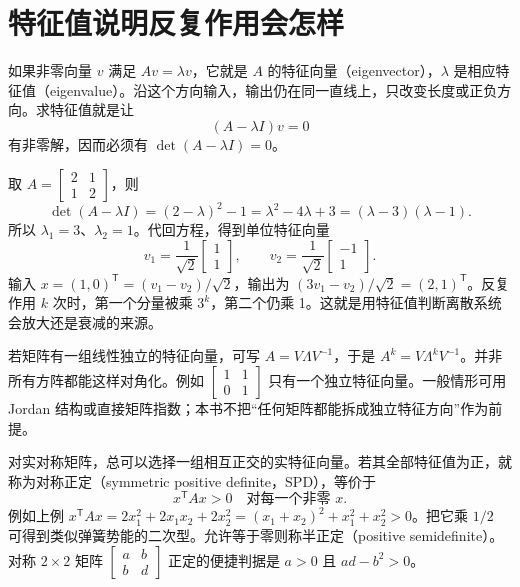 \section{特征值说明反复作用会怎样}
如果非零向量 $v$ 满足 $Av=\lambda v$，它就是 $A$ 的特征向量（eigenvector），$\lambda$ 是相应特征值（eigenvalue）。沿这个方向输入，输出仍在同一直线上，只改变长度或正负方向。求特征值就是让
\begin{equation}
 (A-\lambda I)v=0
\end{equation}
有非零解，因而必须有 $\det(A-\lambda I)=0$。
\begin{examplebox}[算例 手算两个特征值和两个特征方向]
取 $A=\begin{bmatrix}2&1\\1&2\end{bmatrix}$，则
\[
 \det(A-\lambda I)=(2-\lambda)^2-1
 =\lambda^2-4\lambda+3=(\lambda-3)(\lambda-1).
\]
所以 $\lambda_1=3$、$\lambda_2=1$。代回方程，得到单位特征向量
\[
 v_1=\frac{1}{\sqrt2}\begin{bmatrix}1\\1\end{bmatrix},\qquad
 v_2=\frac{1}{\sqrt2}\begin{bmatrix}-1\\1\end{bmatrix}.
\]
输入 $x=(1,0)^\mathsf T=(v_1-v_2)/\sqrt2$，输出为 $(3v_1-v_2)/\sqrt2=(2,1)^\mathsf T$。反复作用 $k$ 次时，第一个分量被乘 $3^k$，第二个仍乘 1。这就是用特征值判断离散系统会放大还是衰减的来源。
\end{examplebox}

若矩阵有一组线性独立的特征向量，可写 $A=V\Lambda V^{-1}$，于是 $A^k=V\Lambda^kV^{-1}$。并非所有方阵都能这样对角化。例如 $\begin{bmatrix}1&1\\0&1\end{bmatrix}$ 只有一个独立特征向量。一般情形可用 Jordan 结构或直接矩阵指数；本书不把“任何矩阵都能拆成独立特征方向”作为前提。

对实对称矩阵，总可以选择一组相互正交的实特征向量。若其全部特征值为正，就称为对称正定（symmetric positive definite，SPD），等价于
\begin{equation}
 x^\mathsf TAx>0\quad\text{对每一个非零 }x.
\end{equation}
例如上例 $x^\mathsf TAx=2x_1^2+2x_1x_2+2x_2^2=(x_1+x_2)^2+x_1^2+x_2^2>0$。把它乘 $1/2$ 可得到类似弹簧势能的二次型。允许等于零则称半正定（positive semidefinite）。对称 $2\times2$ 矩阵 $\begin{bmatrix}a&b\\b&d\end{bmatrix}$ 正定的便捷判据是 $a>0$ 且 $ad-b^2>0$。

